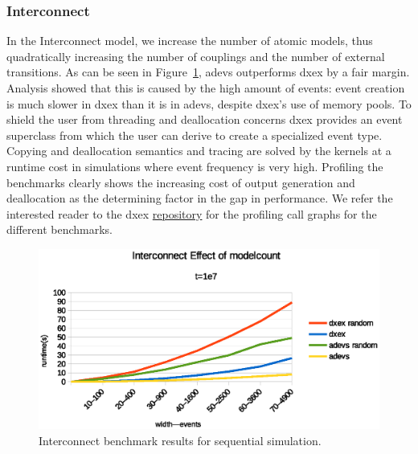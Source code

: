 \subsubsection{Interconnect}\label{4-seq-Interconnect}
In the Interconnect model, we increase the number of atomic models, thus quadratically increasing the number of couplings and the number of external transitions.
As can be seen in Figure~\ref{fig:Interconnect_benchmark}, adevs outperforms dxex by a fair margin.
Analysis showed that this is caused by the high amount of events: event creation is much slower in dxex than it is in adevs, despite dxex's use of memory pools. To shield the user from threading and deallocation concerns dxex provides an event superclass from which the user can derive to create a specialized event type. Copying and deallocation semantics and tracing are solved by the kernels at a runtime cost in simulations where event frequency is very high. Profiling the benchmarks clearly shows the increasing cost of output generation and deallocation as the determining factor in the gap in performance. We refer the interested reader to the dxex \hyperref{https://bitbucket.org/bcardoen/devs-ex-machina}{}{repo}{repository} for the profiling call graphs for the different benchmarks.


\begin{figure}
	\center
	\includegraphics[width=\plotfraction\columnwidth]{fig/interconnect_sequential.eps}
	\caption{Interconnect benchmark results for sequential simulation.}
	\label{fig:Interconnect_benchmark}
\end{figure}
